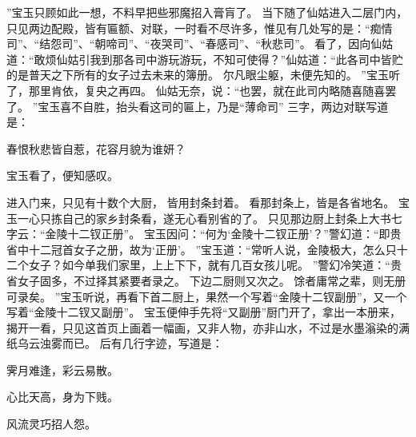 ”宝玉只顾如此一想，不料早把些邪魔招入膏肓了。
当下随了仙姑进入二层门内，只见两边配殿，皆有匾额、对联，一时看不尽许多，惟见有几处写的是：“痴情司”、“结怨司”、“朝啼司”、“夜哭司”、“春感司”、“秋悲司”。
看了，因向仙姑道：“敢烦仙姑引我到那各司中游玩游玩，不知可使得？”仙姑道：“此各司中皆贮的是普天之下所有的女子过去未来的簿册。
尔凡眼尘躯，未便先知的。
”宝玉听了，那里肯依，复央之再四。
仙姑无奈，说：“也罢，就在此司内略随喜随喜罢了。
”宝玉喜不自胜，抬头看这司的匾上，乃是“薄命司”
三字，两边对联写道是：\par
\hop
春恨秋悲皆自惹，花容月貌为谁妍？\par
\hop
宝玉看了，便知感叹。
\par
进入门来，只见有十数个大厨，
皆用封条封着。
看那封条上，皆是各省地名。
宝玉一心只拣自己的家乡封条看，遂无心看别省的了。
只见那边厨上封条上大书七字云：“金陵十二钗正册”。
宝玉因问：“何为‘金陵十二钗正册’？”警幻道：“即贵省中十二冠首女子之册，故为‘正册’。
”宝玉道：“常听人说，金陵极大，怎么只十二个女子？如今单我们家里，上上下下，就有几百女孩儿呢。
”警幻冷笑道：“贵省女子固多，不过择其紧要者录之。
下边二厨则又次之。
馀者庸常之辈，则无册可录矣。
”宝玉听说，再看下首二厨上，果然一个写着“金陵十二钗副册”，又一个写着“金陵十二钗又副册”。
宝玉便伸手先将“又副册”厨门开了，拿出一本册来，揭开一看，只见这首页上画着一幅画，又非人物，亦非山水，不过是水墨滃染的满纸乌云浊雾而已。
后有几行字迹，写道是：\par
\hop
霁月难逢，彩云易散。
\par
心比天高，身为下贱。
\par
风流灵巧招人怨。
